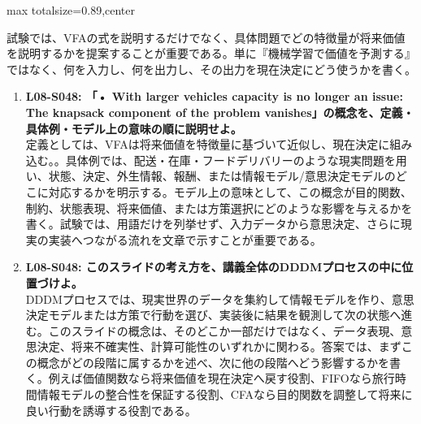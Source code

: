 \begin{minipage}[t]{0.58\textwidth}
\begin{adjustbox}{max totalsize={\textwidth}{0.89\textheight},center}
\begin{minipage}{\textwidth}
試験では、VFAの式を説明するだけでなく、具体問題でどの特徴量が将来価値を説明するかを提案することが重要である。単に『機械学習で価値を予測する』ではなく、何を入力し、何を出力し、その出力を現在決定にどう使うかを書く。\par{}\begin{enumerate}\item \textbf{L08-S048: 「• With larger vehicles capacity is no longer an issue: The knapsack component of the problem vanishes」の概念を、定義・具体例・モデル上の意味の順に説明せよ。}\\定義としては、VFAは将来価値を特徴量に基づいて近似し、現在決定に組み込む。。具体例では、配送・在庫・フードデリバリーのような現実問題を用い、状態、決定、外生情報、報酬、または情報モデル/意思決定モデルのどこに対応するかを明示する。モデル上の意味として、この概念が目的関数、制約、状態表現、将来価値、または方策選択にどのような影響を与えるかを書く。試験では、用語だけを列挙せず、入力データから意思決定、さらに現実の実装へつながる流れを文章で示すことが重要である。\item \textbf{L08-S048: このスライドの考え方を、講義全体のDDDMプロセスの中に位置づけよ。}\\DDDMプロセスでは、現実世界のデータを集約して情報モデルを作り、意思決定モデルまたは方策で行動を選び、実装後に結果を観測して次の状態へ進む。このスライドの概念は、そのどこか一部だけではなく、データ表現、意思決定、将来不確実性、計算可能性のいずれかに関わる。答案では、まずこの概念がどの段階に属するかを述べ、次に他の段階へどう影響するかを書く。例えば価値関数なら将来価値を現在決定へ戻す役割、FIFOなら旅行時間情報モデルの整合性を保証する役割、CFAなら目的関数を調整して将来に良い行動を誘導する役割である。\end{enumerate}
\end{minipage}
\end{adjustbox}
\end{minipage}



